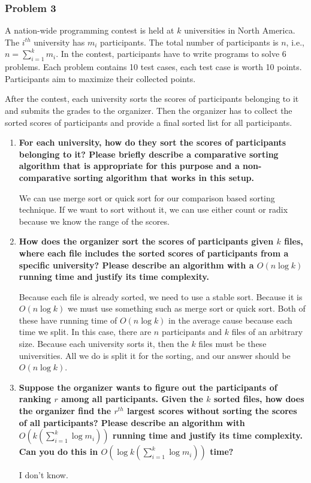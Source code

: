\documentclass[11pt]{article}
\begin{document}
\subsubsection*{Problem 3} 

A nation-wide programming contest is held
at $k$ universities in North America. The $i^{th}$ university has
$m_{i}$ participants. The total number of participants is $n$, i.e.,
$n = \sum_{i=1}^{k}m_{i}$. In the contest, participants have to write
programs to solve 6 problems. Each problem contains 10 test cases,
each test case is worth 10 points. Participants aim to maximize their
collected points.  

After the contest, each university sorts the scores of participants
belonging to it and submits the grades to the organizer.  Then the
organizer has to collect the sorted scores of participants and provide
a final sorted list for all participants.

\begin{enumerate}

\item \textbf{For each university, how do they sort the scores of participants
  belonging to it? Please briefly describe a comparative sorting
  algorithm that is appropriate for this purpose and a non-comparative
  sorting algorithm that works in this setup.}

 We can use merge sort or quick sort for our comparison based sorting technique. If we want to sort without it, we can use either count or radix because we know the range of the scores.

\item \textbf{How does the organizer sort the scores of participants given $k$
  files, where each file includes the sorted scores of participants
  from a specific university?  Please describe an algorithm with a
  $O(n\log k)$ running time and justify its time complexity.}

  Because each file is already sorted, we need to use a stable sort. Because it is $O(n\log k)$ we must use something such as merge sort or quick sort. Both of these have running time of $O(n \log k)$ in the average cause because each time we split. In this case, there are $n$ participants and $k$ files of an arbitrary size. Because each university sorts it, then the $k$ files must be these universities. All we do is split it for the sorting, and our answer should be $O(n \log k)$.

\item \textbf{Suppose the organizer wants to figure out the participants of
  ranking $r$ among all participants. Given the $k$ sorted files, how
  does the organizer find the $r^{th}$ largest scores without sorting
  the scores of all participants?  Please describe an algorithm with
  $O(k (\sum_{i=1}^{k}\log m_{i}) )$ running time and justify its time
  complexity. Can you do this in $O(\log k(\sum_{i=1}^{k}\log m_{i}))$ time?}

I don't know.

\end{enumerate}
\end{document}

